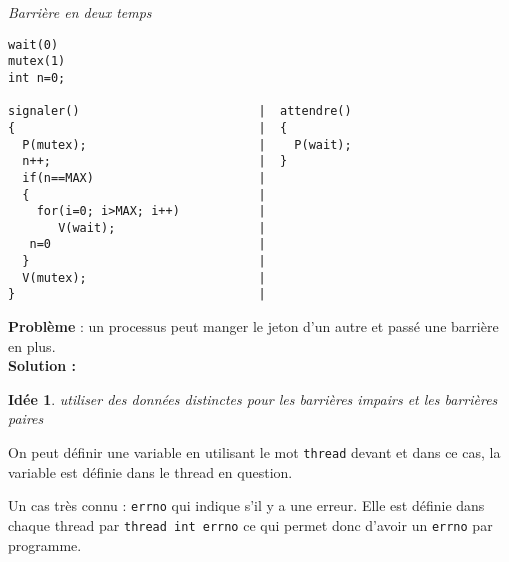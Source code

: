 \documentclass[12pt,a4paper]{report}
\newtheorem*{id}{Idée}
\begin{document}
\textit{Barrière en deux temps}

\begin{center}
\end{center}

\medskip
\begin{verbatim}
wait(0)
mutex(1)
int n=0;

signaler()                         |  attendre()
{                                  |  {
  P(mutex);                        |    P(wait);
  n++;                             |  }
  if(n==MAX)                       |
  {                                |
    for(i=0; i>MAX; i++)           |
       V(wait);                    |
   n=0                             |
  }                                |
  V(mutex);                        |
}                                  |
\end{verbatim}
\medskip

\textbf{Problème} : un processus peut manger le jeton d'un autre et passé une barrière en plus.\\

\textbf{Solution : \\}
\begin{id} utiliser des données distinctes pour les barrières impairs et les barrières paires \end{id}

On peut définir une variable en utilisant le mot \verb?thread? devant et dans ce cas, la variable est définie dans le thread en question.

Un cas très connu : \texttt{errno} qui indique s'il y a une erreur. Elle est définie dans chaque thread par \verb?thread int errno? ce qui permet donc d'avoir un \texttt{errno} par programme.
\end{document}
